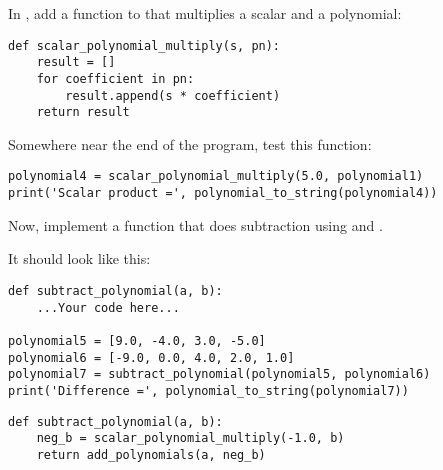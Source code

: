 In , add a function to that multiplies a scalar and a polynomial:
\begin{Verbatim}
def scalar_polynomial_multiply(s, pn):
    result = []
    for coefficient in pn:
        result.append(s * coefficient)
    return result
\end{Verbatim}

Somewhere near the end of the program, test this function:
\begin{Verbatim}
polynomial4 = scalar_polynomial_multiply(5.0, polynomial1)
print('Scalar product =', polynomial_to_string(polynomial4))
\end{Verbatim}

\begin{Exercise}[title=Subtract polynomials in Python, label=pysubpoly]
Now, implement a function that does subtraction using
 and
.

It should look like this:
\begin{Verbatim}
def subtract_polynomial(a, b):
    ...Your code here...

polynomial5 = [9.0, -4.0, 3.0, -5.0]
polynomial6 = [-9.0, 0.0, 4.0, 2.0, 1.0]
polynomial7 = subtract_polynomial(polynomial5, polynomial6)
print('Difference =', polynomial_to_string(polynomial7))
\end{Verbatim}
\end{Exercise}
\begin{Answer}[ref=pysubpoly]
\begin{Verbatim}
def subtract_polynomial(a, b):
    neg_b = scalar_polynomial_multiply(-1.0, b)
    return add_polynomials(a, neg_b)
\end{Verbatim}
\end{Answer}


    
